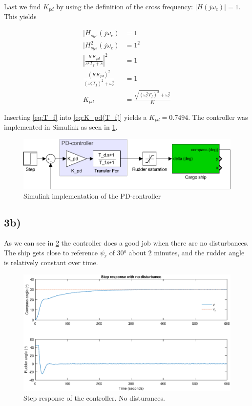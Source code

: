 Last we find $K_{pd}$ by using the definition of the cross frequency: $|H(j\omega_c)| = 1$. This yields

\begin{subequations}
    \begin{align}
        |H_{sys}(j\omega_c) &= 1 \\
        |H_{sys}^2(j\omega_c) &= 1^2 \\
        \left | \frac{KK_{pd}}{s^2T_f+s} \right |^2 &= 1 \\
        \frac{(KK_{pd})^2}{(\omega_c^2 T_f)^2 + \omega_c^2} &= 1 \\
        K_{pd} &= \frac{\sqrt{(\omega_c^2 T_f)^2} + \omega_c^2}{K} \label{eq:K_pd(T_f)}
    \end{align}
\end{subequations}

Inserting \cref{eq:T_f} into \cref{eq:K_pd(T_f)} yields a $K_{pd} = 0.7494$. The controller was implemented in Simulink as seen in \cref{fig:pd}.

\begin{figure}
    \centering
    \includegraphics[width=\textwidth]{images/oppg3/a_pd-loop.pdf}
    \caption{Simulink implementation of the PD-controller}
    \label{fig:pd}
\end{figure}

\subsection{3b)}

As we can see in \cref{fig:step_no_dist} the controller does a good job when there are no disturbances. The ship gets close to reference $\psi_r$ of $30\si{\degree}$ about 2 minutes, and the rudder angle is relatively constant over time.

\begin{figure}
    \centering
    \includegraphics[width=\textwidth]{images/oppg3/stepresp_no_disturbance.eps}
    \caption{Step response of the controller. No disturances.}
    \label{fig:step_no_dist}
\end{figure}


